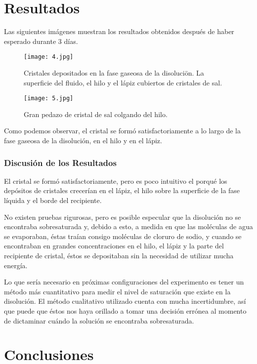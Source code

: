 \documentclass[letterpaper]{article}
\begin{document}
\section*{Resultados}
Las siguientes imágenes muestran los resultados obtenidos después de haber esperado durante 3 días.

\begin{figure}[H]
	\centering
	\texttt{[image: 4.jpg]}
	\caption{Cristales depositados en la fase gaseosa de la disoluciön. La superficie del fluido, el hilo y el lápiz cubiertos de cristales de sal.}
\end{figure}

\begin{figure}[H]
	\centering
	\texttt{[image: 5.jpg]}
	\caption{Gran pedazo de cristal de sal colgando del hilo.}
\end{figure}


Como podemos observar, el cristal se formó satisfactoriamente a lo largo de la fase gaseosa de la disolución, en el hilo y en el lápiz.
\subsubsection*{Discusión de los Resultados}
El cristal se formó satisfactoriamente, pero es poco intuitivo el porqué los depósitos de cristales crecerían en el lápiz, el hilo sobre la superficie de la fase líquida y el borde del recipiente.

No existen pruebas rigurosas, pero es posible especular que la disolución no se encontraba sobresaturada y, debido a esto, a medida en que las moléculas de agua se evaporaban, éstas traían consigo moléculas de cloruro de sodio, y cuando se encontraban en grandes concentraciones en el hilo, el lápiz y la parte del recipiente de cristal, éstos se depositaban sin la necesidad de utilizar mucha energía.

Lo que sería necesario en próximas configuraciones del experimento es tener un método más cuantitativo para medir el nivel de saturación que existe en la disolución. El método cualitativo utilizado cuenta con mucha incertidumbre, así que puede que éstos nos haya orillado a tomar una decisión errónea al momento de dictaminar cuándo la solución se encontraba sobresaturada.

\section*{Conclusiones}
\end{document}
